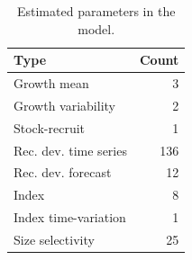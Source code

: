 \documentclass[
]{scrartcl}
\begin{document}
\endgroup

\newpage{}

\begingroup
\fontsize{9.0pt}{10.8pt}\selectfont

\begin{longtable}{lr}

\caption{\label{tbl-n-param}Estimated parameters in the model.}

\tabularnewline

\toprule
Type & Count \\ 
\midrule\addlinespace[2.5pt]
Growth mean & 3 \\ 
Growth variability & 2 \\ 
Stock-recruit & 1 \\ 
Rec. dev. time series & 136 \\ 
Rec. dev. forecast & 12 \\ 
Index & 8 \\ 
Index time-variation & 1 \\ 
Size selectivity & 25 \\ 
\bottomrule

\end{longtable}

\endgroup

\newpage{}
\end{document}
